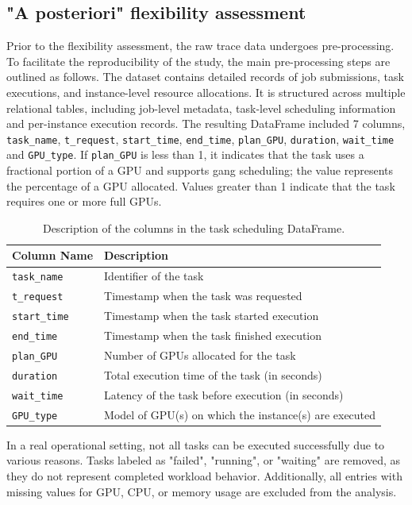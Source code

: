 \documentclass[preprint,12pt]{elsarticle}
\begin{document}
\subsection{"A posteriori" flexibility assessment} \label{a_posteriori}
Prior to the flexibility assessment, the raw trace data undergoes pre-processing. To facilitate the reproducibility of the study, the main pre-processing steps are outlined as follows. The dataset contains detailed records of job submissions, task executions, and instance-level resource allocations. It is structured across multiple relational tables, including job-level metadata, task-level scheduling information and per-instance execution records. The resulting DataFrame included 7 columns, \texttt{task\_name}, \texttt{t\_request}, \texttt{start\_time}, \texttt{end\_time}, \texttt{plan\_GPU}, \texttt{duration}, \texttt{wait\_time} and \texttt{GPU\_type}. If \texttt{plan\_GPU} is less than 1, it indicates that the task uses a fractional portion of a GPU and supports gang scheduling; the value represents the percentage of a GPU allocated. Values greater than 1 indicate that the task requires one or more full GPUs.

\begin{table}[h!]
\centering
\begin{tabular}{ll}
\toprule
\textbf{Column Name} & \textbf{Description} \\
\midrule
\texttt{task\_name}   & Identifier of the task \\
\texttt{t\_request}   & Timestamp when the task was requested \\
\texttt{start\_time}  & Timestamp when the task started execution \\
\texttt{end\_time}    & Timestamp when the task finished execution \\
\texttt{plan\_GPU}    & Number of GPUs allocated for the task \\
\texttt{duration}     & Total execution time of the task (in seconds) \\
\texttt{wait\_time}   & Latency of the task before execution (in seconds)  \\
\texttt{GPU\_type}    & Model of GPU(s) on which the instance(s) are executed \\
\bottomrule
\end{tabular}
\caption{Description of the columns in the task scheduling DataFrame.}
\label{tab:df_columns}
\end{table}

In a real operational setting, not all tasks can be executed successfully due to various reasons.  Tasks labeled as "failed", "running", or "waiting" are removed, as they do not represent completed workload behavior. Additionally, all entries with missing values for GPU, CPU, or memory usage are excluded from the analysis. 
\end{document}
